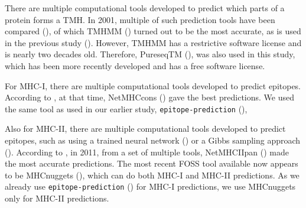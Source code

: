 
There are multiple computational tools developed to predict which
parts of a protein forms a TMH.
In 2001, multiple of such prediction tools have been compared (\cite{moller2001evaluation}),
of which TMHMM (\cite{krogh2001predicting}) turned out to be the most accurate, 
as is used in the previous study (\cite{bianchi2017}).
However, TMHMM has a restrictive software license and is nearly two
decades old.
Therefore, PureseqTM (\cite{wang2019efficient}),
was also used in this study, which has been more recently developed
and has a free software license.


For MHC-I, there are multiple computational tools developed 
to predict epitopes. 
According to \cite{lundegaard2011prediction}, at that time,
NetMHCcons (\cite{karosiene2012netmhccons}) gave the best predictions.
We used the same tool as used in our earlier study, \verb;epitope-prediction; (\cite{bianchi2017}),


Also for MHC-II, there are multiple computational tools developed 
to predict epitopes,
such as using a trained neural network (\cite{nielsen2003reliable})
or a Gibbs sampling approach (\cite{nielsen2004improved}).
According to \cite{lundegaard2011prediction}, in 2011,
from a set of multiple tools, 
NetMHCIIpan (\cite{nielsen2008quantitative,karosiene2013netmhciipan})
made the most accurate predictions.
The most recent FOSS tool available now appears
to be MHCnuggets (\cite{shao2020high}), which can do both MHC-I 
and MHC-II predictions. 
As we already use \verb;epitope-prediction; (\cite{bianchi2017}) 
for MHC-I predictions, we use MHCnuggets only for MHC-II predictions.


